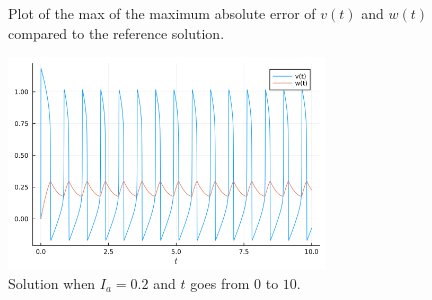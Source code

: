 \documentclass[12pt]{report}
\begin{document}
\begin{solution}
\begin{figure}[H]
        \caption{Plot of the max of the maximum absolute error of $v(t)$ and $w(t)$ compared to the reference solution.}
        \label{2err}
    \end{figure}
    \begin{figure}[H]
        \centering
        \includegraphics[width=0.75\textwidth,height=\textwidth,keepaspectratio]{images/2-final.png}
        \caption{Solution when $I_a = 0.2$ and $t$ goes from $0$ to $10$.}
        \label{2final}
    \end{figure}







\end{solution}

\newpage


\end{document}
